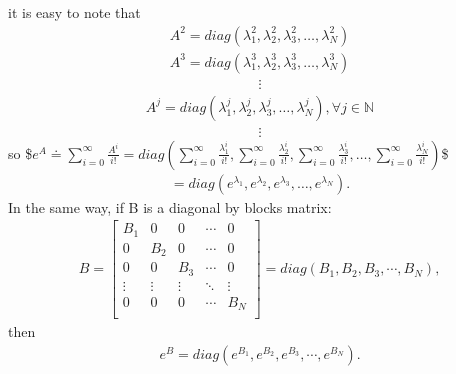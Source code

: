 \documentclass[letterpaper,10pt,english]{jupyterBook}
\begin{document}
\sphinxAtStartPar
it is easy to note that
\begin{equation*}
\begin{split}
    A^2 = diag \left(\lambda_1^2, \lambda_2^2, \lambda_3^2, \dotsc, \lambda_N^2 \right)
\end{split}
\end{equation*}\begin{equation*}
\begin{split}
    A^3 = diag \left(\lambda_1^3, \lambda_2^3, \lambda_3^3, \dotsc, \lambda_N^3 \right)
\end{split}
\end{equation*}\begin{equation*}
\begin{split}
\vdots
\end{split}
\end{equation*}\begin{equation*}
\begin{split}
    A^j = diag \left(\lambda_1^j, \lambda_2^j, \lambda_3^j, \dotsc, \lambda_N^j \right) , \forall j \in \mathbb{N}
\end{split}
\end{equation*}\begin{equation*}
\begin{split}
\vdots
\end{split}
\end{equation*}
\sphinxAtStartPar
so
\$\(
    e^A \doteq \sum_{i=0}^{\infty} \frac{A^i}{i!} = diag\left(\sum_{i=0}^{\infty} \frac{\lambda_1^i}{i!}, \sum_{i=0}^{\infty} \frac{\lambda_2^i}{i!}, \sum_{i=0}^{\infty} \frac{\lambda_3^i}{i!}, \dotsc, \sum_{i=0}^{\infty} \frac{\lambda_N^i}{i!}\right)
\)\$
\begin{equation*}
\begin{split}
    = diag \left( e^{\lambda_1}, e^{\lambda_2}, e^{\lambda_3}, \dotsc, e^{\lambda_N} \right).
\end{split}
\end{equation*}
\sphinxAtStartPar
In the same way, if B is a diagonal by blocks matrix:
\begin{equation*}
\begin{split}
B =   
\left[ {\begin{array}{ccccc}
    B_1 & 0 & 0 & \dotsm & 0\\
    0 & B_2 & 0 & \dotsm & 0\\
    0 & 0 & B_3 & \dotsm & 0\\
    \vdots & \vdots & \vdots & \ddots & \vdots\\
    0 & 0 & 0 & \dotsm & B_{N}\\
\end{array} } \right] 
  = diag(B_1, B_2, B_3, \dotsm, B_N),
\end{split}
\end{equation*}
\sphinxAtStartPar
then
\begin{equation*}
\begin{split}
e^B = diag(e^{B_1}, e^{B_2}, e^{B_3}, \dotsm, e^{B_N}).
\end{split}
\end{equation*}
\end{document}
